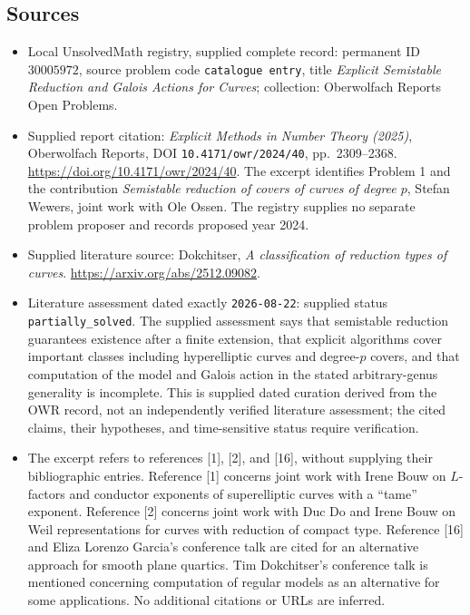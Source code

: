 \documentclass[11pt]{article}
\begin{document}
\subsection{Sources}
\begin{itemize}
\item Local UnsolvedMath registry, supplied complete record: permanent ID \(30005972\), source problem code \texttt{catalogue entry}, title \emph{Explicit Semistable Reduction and Galois Actions for Curves}; collection: Oberwolfach Reports Open Problems.
\item Supplied report citation: \emph{Explicit Methods in Number Theory (2025)}, Oberwolfach Reports, DOI \texttt{10.4171/owr/2024/40}, pp.\ 2309--2368. \url{https://doi.org/10.4171/owr/2024/40}. The excerpt identifies Problem 1 and the contribution \emph{Semistable reduction of covers of curves of degree \(p\)}, Stefan Wewers, joint work with Ole Ossen. The registry supplies no separate problem proposer and records proposed year 2024.
\item Supplied literature source: Dokchitser, \emph{A classification of reduction types of curves}. \url{https://arxiv.org/abs/2512.09082}.
\item Literature assessment dated exactly \texttt{2026-08-22}: supplied status \texttt{partially\_solved}. The supplied assessment says that semistable reduction guarantees existence after a finite extension, that explicit algorithms cover important classes including hyperelliptic curves and degree-\(p\) covers, and that computation of the model and Galois action in the stated arbitrary-genus generality is incomplete. This is supplied dated curation derived from the OWR record, not an independently verified literature assessment; the cited claims, their hypotheses, and time-sensitive status require verification.
\item The excerpt refers to references [1], [2], and [16], without supplying their bibliographic entries. Reference [1] concerns joint work with Irene Bouw on \(L\)-factors and conductor exponents of superelliptic curves with a ``tame'' exponent. Reference [2] concerns joint work with Duc Do and Irene Bouw on Weil representations for curves with reduction of compact type. Reference [16] and Eliza Lorenzo Garcia's conference talk are cited for an alternative approach for smooth plane quartics. Tim Dokchitser's conference talk is mentioned concerning computation of regular models as an alternative for some applications. No additional citations or URLs are inferred.
\end{itemize}
\end{document}
